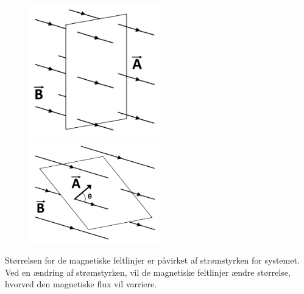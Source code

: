 \begin{figure}[H]
	\centering
	\begin{minipage}[b]{0.48\textwidth}
	\centering
	\includegraphics[width=0.5\textwidth]{Vildledning/Schematics/Magnetfelt_vinkelret} %
	\end{minipage}
	\hfill
	\begin{minipage}[b]{0.48\textwidth}
	\centering
	\includegraphics[width=0.5\textwidth]{Vildledning/Schematics/Magnetfelt_vinklet} %
	\end{minipage}
\end{figure}

Størrelsen for de magnetiske feltlinjer er påvirket af strømstyrken for systemet. Ved en ændring af strømstyrken, vil de magnetiske feltlinjer ændre størrelse, hvorved den magnetiske flux vil varriere.